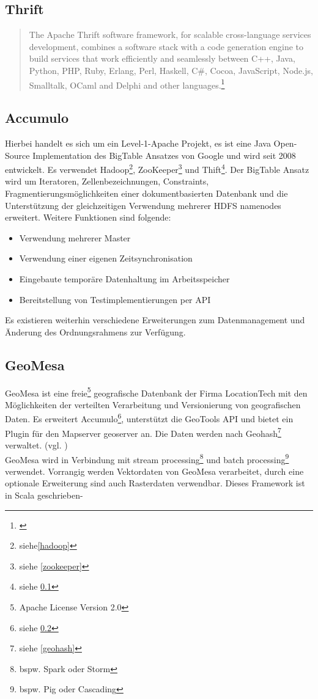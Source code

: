 \subsection{Thrift}
\label{thrift}
\begin{quote}
The Apache Thrift software framework, for scalable cross-language services development, combines a software stack with a code generation engine to build services that work efficiently and seamlessly between C++, Java, Python, PHP, Ruby, Erlang, Perl, Haskell, C\#, Cocoa, JavaScript, Node.js, Smalltalk, OCaml and Delphi and other languages.\footnote{\cite{website:thrift}}
\end{quote}


\subsection{Accumulo}
\label{accumulo}
Hierbei handelt es sich um ein Level-1-Apache Projekt, es ist eine Java Open-Source Implementation des BigTable Ansatzes von Google und wird seit 2008 entwickelt.
Es verwendet Hadoop\footnote{siehe\ref{hadoop}}, ZooKeeper\footnote{siehe \ref{zookeeper}} und Thift\footnote{siehe \ref{thrift}}.
Der BigTable Ansatz wird um Iteratoren, Zellenbezeichnungen, Constraints, Fragmentierungsmöglichkeiten einer dokumentbasierten Datenbank und die Unterstützung der gleichzeitigen Verwendung mehrerer HDFS namenodes erweitert.
Weitere Funktionen sind folgende:
\begin{itemize}
\item Verwendung mehrerer Master
\item Verwendung einer eigenen Zeitsynchronisation
\item Eingebaute temporäre Datenhaltung im Arbeitsspeicher
\item Bereitstellung von Testimplementierungen per API
\end {itemize}
Es existieren weiterhin verschiedene Erweiterungen zum Datenmanagement und Änderung des Ordnungsrahmens zur Verfügung. \cite{website:accumulo_features}

\subsection{GeoMesa}

GeoMesa ist eine freie\footnote{Apache License Version 2.0} geografische Datenbank der Firma LocationTech mit den Möglichkeiten der verteilten Verarbeitung und Versionierung von geografischen Daten.
Es erweitert Accumulo\footnote{siehe \ref{accumulo}},  unterstützt die GeoTools API und bietet ein Plugin für den Mapserver \Gls{geoserver} an.
Die Daten werden nach Geohash\footnote{siehe \ref{geohash}} verwaltet. (vgl. \cite{website:geomesaeclipse})\\
GeoMesa wird in Verbindung mit stream processing\footnote{bspw. Spark oder Storm} und batch processing\footnote{bspw. Pig oder Cascading} verwendet.
Vorrangig werden Vektordaten von GeoMesa verarbeitet, durch eine optionale Erweiterung sind auch Rasterdaten verwendbar.
Dieses Framework ist in Scala geschrieben-

